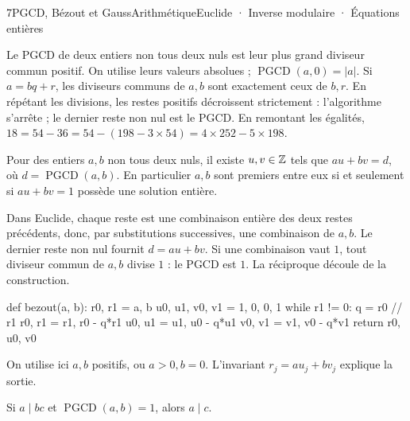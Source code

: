 \begin{ouverture}[denombrement]{7}{PGCD, Bézout et Gauss}{Arithmétique}{Euclide · Inverse modulaire · Équations entières}
\end{ouverture}
\essentiel

Le PGCD de deux entiers non tous deux nuls est leur plus grand diviseur commun positif. On utilise leurs valeurs absolues ; $\operatorname{PGCD}(a,0)=|a|$.
Si $a=bq+r$, les diviseurs communs de $a,b$ sont exactement ceux de $b,r$.
En répétant les divisions, les restes positifs décroissent strictement : l'algorithme s'arrête ; le dernier reste non nul est le PGCD.
En remontant les égalités, $18=54-36=54-(198-3\times54)=4\times252-5\times198$.
\begin{theoreme}
Pour des entiers $a,b$ non tous deux nuls, il existe $u,v\in\mathbb{Z}$ tels que $au+bv=d$, où $d=\operatorname{PGCD}(a,b)$.
En particulier $a,b$ sont premiers entre eux si et seulement si $au+bv=1$ possède une solution entière.
\end{theoreme}
\begin{demonstration}
Dans Euclide, chaque reste est une combinaison entière des deux restes précédents, donc, par substitutions successives, une combinaison de $a,b$. Le dernier reste non nul fournit $d=au+bv$.
Si une combinaison vaut $1$, tout diviseur commun de $a,b$ divise $1$ : le PGCD est $1$. La réciproque découle de la construction.
\end{demonstration}
\begin{python}
def bezout(a, b):
    r0, r1 = a, b
    u0, u1, v0, v1 = 1, 0, 0, 1
    while r1 != 0:
        q = r0 // r1
        r0, r1 = r1, r0 - q*r1
        u0, u1 = u1, u0 - q*u1
        v0, v1 = v1, v0 - q*v1
    return r0, u0, v0
\end{python}
On utilise ici $a,b$ positifs, ou $a>0,b=0$. L'invariant $r_j=au_j+bv_j$ explique la sortie.
\begin{theoreme}
Si $a\mid bc$ et $\operatorname{PGCD}(a,b)=1$, alors $a\mid c$.
\end{theoreme}
